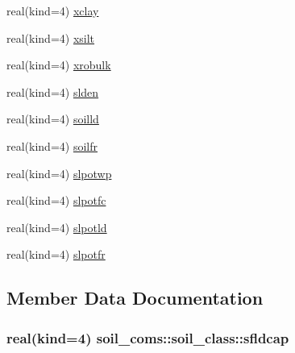\begin{DoxyCompactItemize}
\item 
real(kind=4) \hyperlink{structsoil__coms_1_1soil__class_aceee9b2a612e85b8853246b03a03a438}{xclay}
\item 
real(kind=4) \hyperlink{structsoil__coms_1_1soil__class_a12d1d7cdc5452e72225e5b79a1188a02}{xsilt}
\item 
real(kind=4) \hyperlink{structsoil__coms_1_1soil__class_a280114239df2814bcb3a49428719dba7}{xrobulk}
\item 
real(kind=4) \hyperlink{structsoil__coms_1_1soil__class_a1917cc9d6826227057b82381e6625b58}{slden}
\item 
real(kind=4) \hyperlink{structsoil__coms_1_1soil__class_a2106363007b37e661042de3d39b3d584}{soilld}
\item 
real(kind=4) \hyperlink{structsoil__coms_1_1soil__class_aeb0ceb4921d68cf8efdd5257baabce1e}{soilfr}
\item 
real(kind=4) \hyperlink{structsoil__coms_1_1soil__class_ab7a36999cd5d01ac865ecdca1a1077da}{slpotwp}
\item 
real(kind=4) \hyperlink{structsoil__coms_1_1soil__class_a8ffde0aab6ba1e86a7d95a0da06af20c}{slpotfc}
\item 
real(kind=4) \hyperlink{structsoil__coms_1_1soil__class_a12e604bf9c67e0f6dd50d5453f68c7cd}{slpotld}
\item 
real(kind=4) \hyperlink{structsoil__coms_1_1soil__class_a92304babd81edfcf9cae49c239f8e4ac}{slpotfr}
\end{DoxyCompactItemize}


\subsection{Member Data Documentation}
\subsubsection[{\texorpdfstring{sfldcap}{sfldcap}}]{\setlength{\rightskip}{0pt plus 5cm}real(kind=4) soil\+\_\+coms\+::soil\+\_\+class\+::sfldcap}\hypertarget{structsoil__coms_1_1soil__class_afc91c8dce6fabd9a9281cc5d08e4aa76}{}\label{structsoil__coms_1_1soil__class_afc91c8dce6fabd9a9281cc5d08e4aa76}
